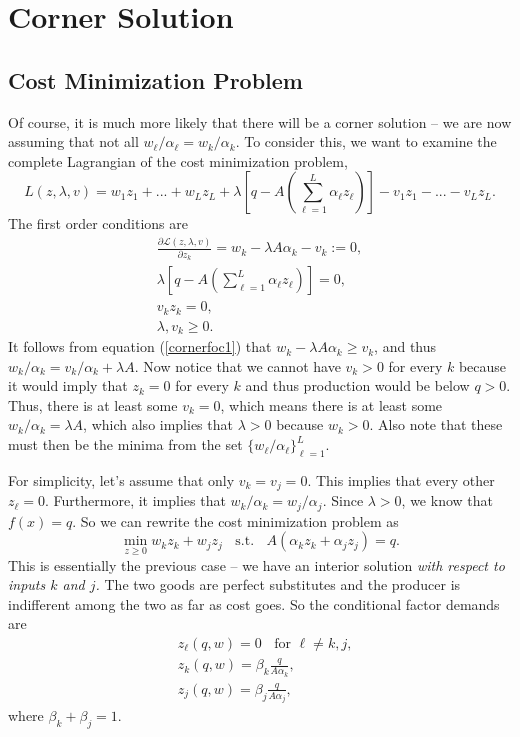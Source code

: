 \documentclass[12pt]{article}
\theoremstyle{definition}
\begin{document}
\section{Corner Solution}

\subsection{Cost Minimization Problem}

Of course, it is much more likely that there will be a corner solution -- we are now assuming that not all $w_{\ell}/\alpha_{\ell} = w_k/\alpha_k$. To consider this, we want to examine the complete Lagrangian of the cost minimization problem,
	\[L(z, \lambda, v) = w_1z_1 + ... + w_Lz_L + \lambda \left[ q - A \left(\sum_{\ell = 1}^L \alpha_{\ell} z_{\ell} \right) \right] -v_1z_1 - ... - v_Lz_L.	\]
The first order conditions are
\begin{align}
	\frac{\partial \mathcal{L}(z, \lambda, v)}{\partial z_k} = w_k - \lambda A \alpha_k - v_k :=0, \label{cornerfoc1}\\
	 \lambda \left[ q - A \left(\sum_{\ell = 1}^L \alpha_{\ell} z_{\ell} \right) \right] =0,\\
	 v_kz_k =0,\\
	 \lambda, v_k \geq 0.
\end{align}
It follows from equation (\ref{cornerfoc1}) that $w_k - \lambda A \alpha_k \geq v_k$, and thus $w_k/\alpha_k = v_k/\alpha_k +  \lambda A$. Now notice that we cannot have $v_k>0$ for every $k$ because it would imply that $z_k=0$ for every $k$ and thus production would be below $q>0$.  Thus, there is at least some $v_k=0$, which means there is at least some $w_k/\alpha_k = \lambda A$, which also implies that $\lambda >0$ because $w_k>0$. Also note that these must then be the minima from the set $\{w_{\ell}/\alpha_{\ell}\}_{\ell=1}^L$.

For simplicity, let's assume that only $v_k = v_j=0$. This implies that every other $z_{\ell} =0$. Furthermore, it implies that $w_k/\alpha_k = w_j/\alpha_j$. Since $\lambda > 0$, we know that $f(x)=q$. So we can rewrite the cost minimization problem as
	\[\min_{z \geq 0} w_kz_k + w_jz_j \;\; \text{ s.t. } \;\; A(\alpha_k z_k + \alpha_j z_j) = q.	\]
This is essentially the previous case -- we have an interior solution \emph{with respect to inputs $k$ and $j$.} The two goods are perfect substitutes and the producer is indifferent among the two as far as cost goes. So the conditional factor demands are
\begin{align*}
	&z_{\ell}(q,w) =0 \;\; \text{ for } \ell \neq k,j,\\
	&z_k(q,w) = \beta_k \frac{q}{A \alpha_k},\\
	&z_j(q,w) = \beta_j \frac{q}{A \alpha_j}, 
\end{align*}
where $\beta_k + \beta_j =1.$
\end{document}
